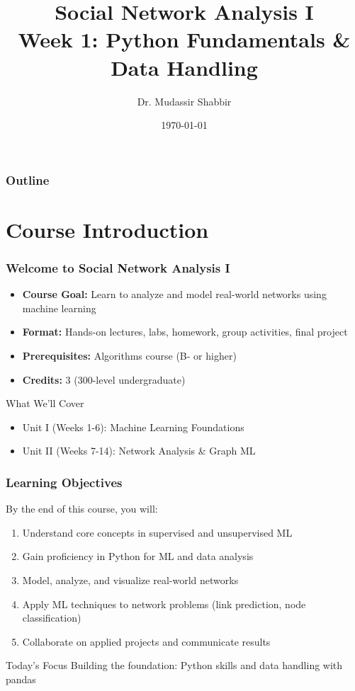 \documentclass[aspectratio=169]{beamer}
\title[SNA-I Week 1]{Social Network Analysis I\\Week 1: Python Fundamentals \& Data Handling}
\author{Dr. Mudassir Shabbir}
\institute{Fall 2025}
\date{\today}
\begin{document}
\frame{\titlepage}

\begin{frame}
\frametitle{Outline}
\tableofcontents
\end{frame}

\section{Course Introduction}

\begin{frame}
\frametitle{Welcome to Social Network Analysis I}
\begin{itemize}
    \item \textbf{Course Goal:} Learn to analyze and model real-world networks using machine learning
    \item \textbf{Format:} Hands-on lectures, labs, homework, group activities, final project
    \item \textbf{Prerequisites:} Algorithms course (B- or higher)
    \item \textbf{Credits:} 3 (300-level undergraduate)
\end{itemize}

\vspace{1em}
\begin{block}{What We'll Cover}
\begin{itemize}
    \item Unit I (Weeks 1-6): Machine Learning Foundations
    \item Unit II (Weeks 7-14): Network Analysis \& Graph ML
\end{itemize}
\end{block}
\end{frame}

\begin{frame}
\frametitle{Learning Objectives}
By the end of this course, you will:
\begin{enumerate}
    \item Understand core concepts in supervised and unsupervised ML
    \item Gain proficiency in Python for ML and data analysis
    \item Model, analyze, and visualize real-world networks
    \item Apply ML techniques to network problems (link prediction, node classification)
    \item Collaborate on applied projects and communicate results
\end{enumerate}

\vspace{1em}
\begin{alertblock}{Today's Focus}
Building the foundation: Python skills and data handling with pandas
\end{alertblock}
\end{frame}
\end{document}
